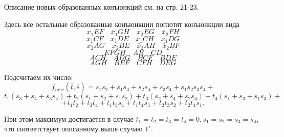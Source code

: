 \documentclass[12pt,a4paper,oneside,fleqn,leqno]{article}
\theoremstyle{definition}
\begin{document}
			Описание новых образованных конъюнкций см. на стр. 21-23.\par
			Здесь все остальные образованные конъюнкции поглотят конъюнкции вида
			$$
				x_1EF\quad \bar{x}_1GH\quad  x_2EG\quad  \bar{x}_2FH
			$$
			$$
				x_1CF\quad  x_1DE\quad 
				\bar{x}_1CH\quad  \bar{x}_1DG$$ $$
				x_2AG\quad  x_2BE\quad 
				\bar{x}_2AH\quad  \bar{x}_2BF
			$$
			$$
				EFGH\quad  AB\quad  CD$$
			$$
				ACH\quad  ADG\quad  BCF\quad  BDE
			$$
			$$
				AGH\quad  BEF\quad  CFH\quad  DEG
			$$\par
			Подсчитаем их число:
			$$
				f_{new}(\bar{t}, \bar{s}) = s_1s_2 + s_1s_3 + s_2s_4 + s_3s_4 + s_1s_2s_3s_4 +
			$$
			$$ 
				t_1(s_3 + s_4 + s_3s_4) + t_2(s_1 + s_2 + s_1s_2) + t_3(s_2 + s_4 + s_2s_4) + t_4(s_1 + s_3 + s_1s_3) + 
			$$
			$$
				+ t_1t_2 + t_3t_4 + t_1t_3s_4 + t_1t_4s_3 + t_2t_3s_2 + t_2t_4s_1.
			$$\par
			При этом максимум достигается в случае $t_1 = t_2 = t_3 = t_4 = 0, s_1=s_2=s_3=s_4,$ что соответствует описанному выше случаю $1^{\circ}.$
		\newpage
\end{document}
